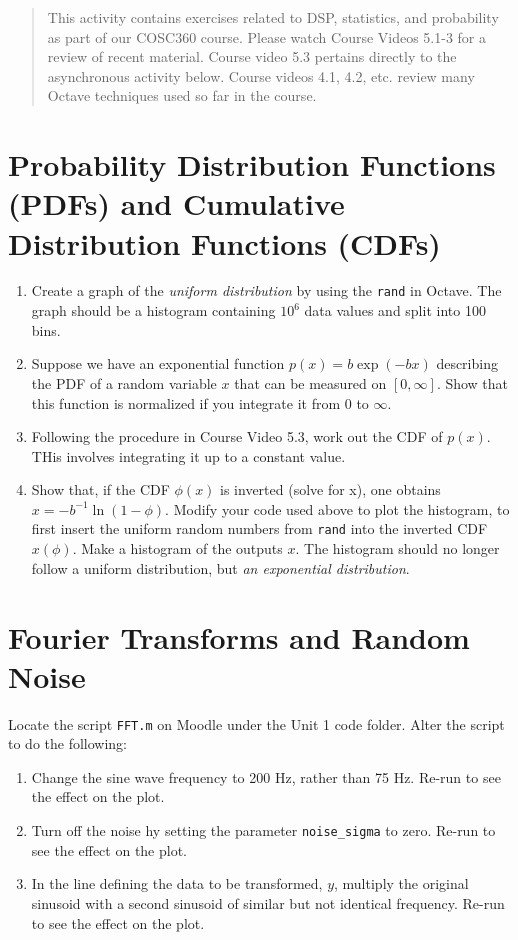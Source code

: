 \documentclass[12pt]{article}
\begin{document}
\maketitle

\begin{abstract}
This activity contains exercises related to DSP, statistics, and probability as part of our COSC360 course.  Please watch Course Videos 5.1-3 for a review of recent material.  Course video 5.3 pertains directly to the asynchronous activity below.  Course videos 4.1, 4.2, etc. review many Octave techniques used so far in the course.
\end{abstract}

\section{Probability Distribution Functions (PDFs) and Cumulative Distribution Functions (CDFs)}

\begin{enumerate}
\item Create a graph of the \textit{uniform distribution} by using the \verb+rand+ in Octave.  The graph should be a histogram containing $10^6$ data values and split into 100 bins.
\item Suppose we have an exponential function $p(x) = b \exp(-b x)$ describing the PDF of a random variable $x$ that can be measured on $[0,\infty]$.  Show that this function is normalized if you integrate it from $0$ to $\infty$.
\item Following the procedure in Course Video 5.3, work out the CDF of $p(x)$.  THis involves integrating it up to a constant value.
\item Show that, if the CDF $\phi(x)$ is inverted (solve for x), one obtains $x = -b^{-1} \ln(1-\phi)$.
Modify your code used above to plot the histogram, to first insert the uniform random numbers from \verb+rand+ into the inverted CDF $x(\phi)$.  Make a histogram of the outputs $x$.  The histogram should no longer follow a uniform distribution, but \textit{an exponential distribution}.
\end{enumerate}

\section{Fourier Transforms and Random Noise}

Locate the script \verb+FFT.m+ on Moodle under the Unit 1 code folder.  Alter the script to do the following:

\begin{enumerate}
\item Change the sine wave frequency to 200 Hz, rather than 75 Hz.  Re-run to see the effect on the plot.
\item Turn off the noise hy setting the parameter \verb+noise_sigma+ to zero.  Re-run to see the effect on the plot.
\item In the line defining the data to be transformed, $y$, multiply the original sinusoid with a second sinusoid of similar but not identical frequency.  Re-run to see the effect on the plot.
\end{enumerate}
\end{document}

